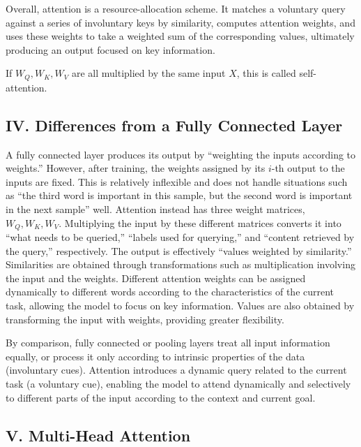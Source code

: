 Overall, attention is a resource-allocation scheme. It matches a voluntary query against a series of involuntary keys by similarity, computes attention weights, and uses these weights to take a weighted sum of the corresponding values, ultimately producing an output focused on key information.

If \(W_Q,W_K,W_V\) are all multiplied by the same input \(X\), this is called self-attention.

\hypertarget{iv.-differences-from-a-fully-connected-layer}{%
\subsection{IV. Differences from a Fully Connected Layer}\label{iv.-differences-from-a-fully-connected-layer}}

A fully connected layer produces its output by ``weighting the inputs according to weights.'' However, after training, the weights assigned by its \(i\)-th output to the inputs are fixed. This is relatively inflexible and does not handle situations such as ``the third word is important in this sample, but the second word is important in the next sample'' well. Attention instead has three weight matrices, \(W_Q,W_K,W_V\). Multiplying the input by these different matrices converts it into ``what needs to be queried,'' ``labels used for querying,'' and ``content retrieved by the query,'' respectively. The output is effectively ``values weighted by similarity.'' Similarities are obtained through transformations such as multiplication involving the input and the weights. Different attention weights can be assigned dynamically to different words according to the characteristics of the current task, allowing the model to focus on key information. Values are also obtained by transforming the input with weights, providing greater flexibility.

By comparison, fully connected or pooling layers treat all input information equally, or process it only according to intrinsic properties of the data (involuntary cues). Attention introduces a dynamic query related to the current task (a voluntary cue), enabling the model to attend dynamically and selectively to different parts of the input according to the context and current goal.

\hypertarget{v.-multi-head-attention}{%
\subsection{V. Multi-Head Attention}\label{v.-multi-head-attention}}

